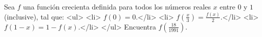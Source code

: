 Sea $f$ una función crecienta definida para todos los números reales $x$ entre $0$ y $1$ (inclusive), tal que:
<ul>
<li> $f(0)=0$.</li>
<li> $f\left(\frac x3\right)=\frac{f(x)}{2}$.</li>
<li> $f(1-x)=1-f(x)$.</li>
</ul>
Encuentra $f\left(\frac{18}{1991}\right)$. 